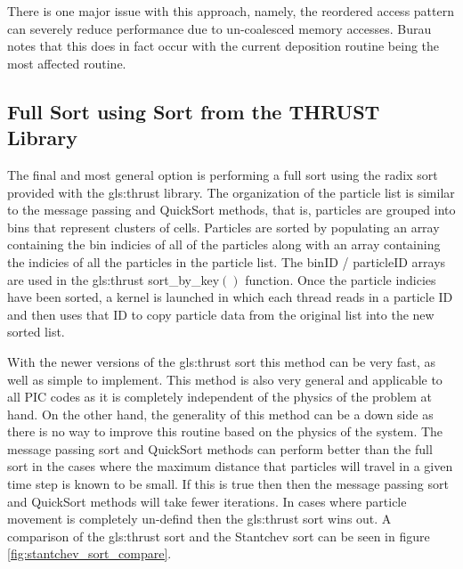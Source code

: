 	There is one major issue with this approach, namely, the reordered access pattern can severely reduce performance due to un-coalesced memory accesses. Burau notes that this does in fact occur with the current deposition routine being the most affected routine. \cite{Burau2010} %

	\subsection{Full Sort using Sort from the THRUST Library}
	The final and most general option is performing a full sort using the radix sort provided with the \gls{gls:thrust} library.\cite{NVIDIACorporation2011a} The organization of the particle list is similar to the message passing and QuickSort methods, that is, particles are grouped into bins that represent clusters of cells. Particles are sorted by populating an array containing the bin indicies of all of the particles along with an array containing the indicies of all the particles in the particle list. The binID / particleID arrays are used in the \gls{gls:thrust} sort\_by\_key$()$ function. Once the particle indicies have been sorted, a kernel is launched in which each thread reads in a particle ID and then uses that ID to copy particle data from the original list into the new sorted list. 

	With the newer versions of the \gls{gls:thrust} sort this method can be very fast, as well as simple to implement. This method is also very general and applicable to all PIC codes as it is completely independent of the physics of the problem at hand. On the other hand, the generality of this method can be a down side as there is no way to improve this routine based on the physics of the system. The message passing sort and QuickSort methods can perform better than the full sort in the cases where the maximum distance that particles will travel in a given time step is known to be small. If this is true then then the message passing sort and QuickSort methods will take fewer iterations. In cases where particle movement is completely un-defind then the \gls{gls:thrust} sort wins out. A comparison of the \gls{gls:thrust} sort and the Stantchev sort can be seen in figure \ref{fig:stantchev_sort_compare}. 





